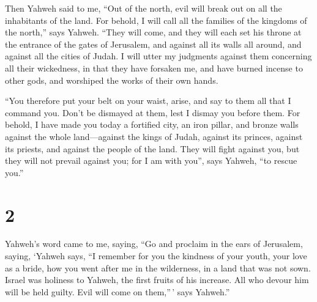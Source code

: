  Then Yahweh said to me, ``Out of the north, evil will
break out on all the inhabitants of the land.  For
behold, I will call all the families of the kingdoms of the north,''
says Yahweh. ``They will come, and they will each set his throne at the
entrance of the gates of Jerusalem, and against all its walls all
around, and against all the cities of Judah.  I will
utter my judgments against them concerning all their wickedness, in that
they have forsaken me, and have burned incense to other gods, and
worshiped the works of their own hands.

 ``You therefore put your belt on your waist, arise, and
say to them all that I command you. Don't be dismayed at them, lest I
dismay you before them.  For behold, I have made you
today a fortified city, an iron pillar, and bronze walls against the
whole land---against the kings of Judah, against its princes, against
its priests, and against the people of the land.  They
will fight against you, but they will not prevail against you; for I am
with you'', says Yahweh, ``to rescue you.''

\hypertarget{section-1}{%
\section{2}\label{section-1}}

 Yahweh's word came to me, saying,  ``Go and
proclaim in the ears of Jerusalem, saying, `Yahweh says, ``I remember
for you the kindness of your youth, your love as a bride, how you went
after me in the wilderness, in a land that was not sown. 
Israel was holiness to Yahweh, the first fruits of his increase. All who
devour him will be held guilty. Evil will come on them,''\,' says
Yahweh.''

